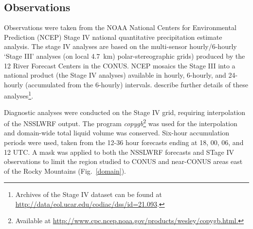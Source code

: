 \subsection{Observations}
\label{observations}

Observations were taken from the NOAA National Centers for Environmental Prediction (NCEP) Stage IV national quantitative precipitation estimate analysis. The stage IV analyses are based on the multi-sensor hourly/6-hourly `Stage III' analyses (on local \mbox{4.7 km}) polar-stereographic grids) produced by the 12 River Forecast Centers in the CONUS. NCEP mosaics the Stage III into a national product (the Stage IV analyses) available in hourly, 6-hourly, and 24-hourly (accumulated from the 6-hourly) intervals. \cite{StageIV} describe further details of these analyses\footnote{Archives of the Stage IV dataset can be found at \url{http://data/eol.ucar.edu/codiac/dss/id=21.093}.}.

Diagnostic analyses were conducted on the Stage IV grid, requiring interpolation of the NSSLWRF output. The program \emph{copygb}\footnote{Available at \url{http://www.cpc.ncep.noaa.gov/products/wesley/copygb.html.}} was used for the interpolation and domain-wide total liquid volume was conserved. Six-hour accumulation periods were used, taken from the 12-36 hour forecasts ending at 18, 00, 06, and 12 UTC. A mask was applied to both the NSSLWRF forecasts and STage IV observations to limit the region studied to CONUS and near-CONUS areas east of the Rocky Mountains \mbox{(Fig. \ref{domain})}.


